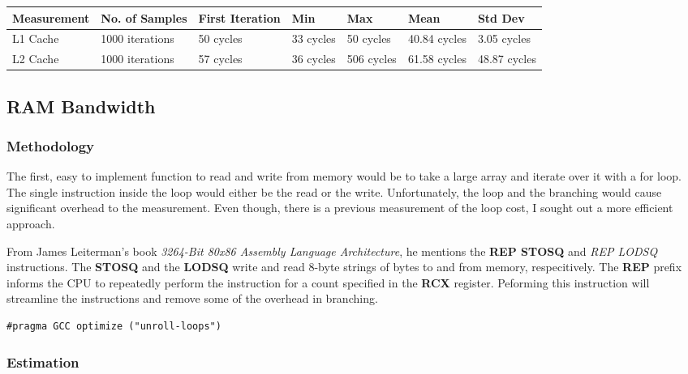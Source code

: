 \documentclass[paper=a4, fontsize=11pt]{scrartcl}
\numberwithin{equation}{section}        %
\numberwithin{figure}{section}          %
\numberwithin{table}{section}               %
\begin{document}
\begin{center}
    \begin{tabular}{ | l | l | l | l | l | l | l |}
    \hline
    Measurement & No. of Samples & First Iteration & Min & Max & Mean & Std Dev \\
    \hline
    L1 Cache & 1000 iterations & 50 cycles & 33 cycles & 50 cycles & 40.84 cycles & 3.05  cycles \\ 
    L2 Cache & 1000 iterations & 57 cycles & 36 cycles & 506 cycles & 61.58 cycles & 48.87  cycles \\ 
    \hline
    \end{tabular}
\end{center}


\subsection{RAM Bandwidth}

\subsubsection{Methodology}

The first, easy to implement function to read and write from memory would be to take a large array and iterate over it with a for loop.  The single instruction inside the loop would either be the read or the write.  Unfortunately, the loop and the branching would cause significant overhead to the measurement.  Even though, there is a previous measurement of the loop cost, I sought out a more efficient approach.

From James Leiterman's book \textit{32\/64-Bit 80x86 Assembly Language Architecture}, he mentions the \textbf{REP STOSQ} and \textit{REP LODSQ} instructions.  The \textbf{STOSQ} and the \textbf{LODSQ} write and read 8-byte strings of bytes to and from memory, respecitively.  The \textbf{REP} prefix informs the CPU to repeatedly perform the instruction for a count specified in the \textbf{RCX} register.  Peforming this instruction will streamline the instructions and remove some of the overhead in branching.

\lstset{language=C}
\begin{lstlisting}
#pragma GCC optimize ("unroll-loops")
\end{lstlisting}

\subsubsection{Estimation}
\end{document}
